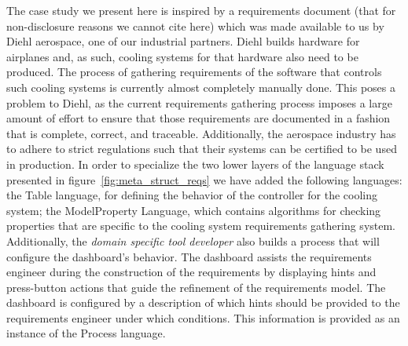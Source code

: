 The case study we present here is inspired by a requirements document (that for
non-disclosure reasons we cannot cite here) which was made available to us by
Diehl aerospace, one of our industrial partners. Diehl builds hardware for
airplanes and, as such, cooling systems for that hardware also need to be
produced. The process of gathering requirements of the software that controls
such cooling systems is currently almost completely manually done. This poses a
problem to Diehl, as the current requirements gathering process imposes a large
amount of effort to ensure that those requirements are documented in a fashion
that is complete, correct, and traceable. Additionally, the aerospace industry
has to adhere to strict regulations such that their systems can be certified to
be used in production.
In order to specialize the two lower layers of the language stack presented in
figure~\ref{fig:meta_struct_reqs} we have added the following languages: the
\textsf{Table} language, for defining the behavior of the controller for the
cooling system; the \textsf{ModelProperty} Language, which contains algorithms
for checking properties that are specific to the cooling system requirements
gathering system. Additionally, the \emph{domain specific tool developer} also
builds a process that will configure the dashboard's behavior. The dashboard assists the
requirements engineer during the construction of the requirements by displaying
hints and press-button actions that guide the refinement of the requirements
model. The dashboard is configured by a description of which hints should be
provided to the requirements engineer under which conditions. This information
is provided as an instance of the \textsf{Process} language.

